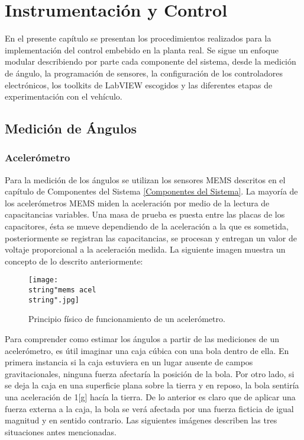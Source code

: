 \documentclass[../main.tex]{subfiles}
\begin{document}
\chapter{Instrumentación y Control}

En el presente capítulo se presentan los procedimientos realizados
para la implementación del control embebido en la planta real. Se
sigue un enfoque modular describiendo por parte cada componente del
sistema, desde la medición de ángulo, la programación de sensores,
la configuración de los controladores electrónicos, los toolkits de
LabVIEW escogidos y las diferentes etapas de experimentación con el
vehículo.

\section{Medición de Ángulos}

\subsection{Acelerómetro}

Para la medición de los ángulos se utilizan los sensores MEMS descritos
en el capítulo de Componentes del Sistema \ref{Componentes del Sistema}. La mayoría de los acelerómetros
MEMS miden la aceleración por medio de la lectura de capacitancias
variables. Una masa de prueba es puesta entre las placas de los capacitores,
ésta se mueve dependiendo de la aceleración a la que es sometida,
posteriormente se registran las capacitancias, se procesan y entregan
un valor de voltaje proporcional a la aceleración medida. La siguiente
imagen muestra un concepto de lo descrito anteriormente:

\begin{figure}[H]
\noindent \begin{centering}
\texttt{[image: \\string"mems acel\\string".jpg]}
\par\end{centering}
\caption{Principio físico de funcionamiento de un acelerómetro.}
\end{figure}

Para comprender como estimar los ángulos a partir de las mediciones
de un acelerómetro, es útil imaginar una caja cúbica con una bola
dentro de ella. En primera instancia si la caja estuviera en un lugar
ausente de campos gravitacionales, ninguna fuerza afectaría la posición
de la bola. Por otro lado, si se deja la caja en una superficie plana
sobre la tierra y en reposo, la bola sentiría una aceleración de 1{[}g{]}
hacía la tierra. De lo anterior es claro que de aplicar una fuerza
externa a la caja, la bola se verá afectada por una fuerza ficticia
de igual magnitud y en sentido contrario. Las siguientes imágenes
describen las tres situaciones antes mencionadas.
\end{document}
